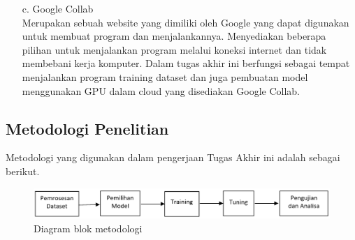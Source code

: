 \begin{itemize}
   \item [c.] Google Collab \\
   Merupakan sebuah website yang dimiliki oleh Google yang dapat digunakan untuk membuat program dan 
   menjalankannya. Menyediakan beberapa pilihan untuk menjalankan program melalui koneksi internet dan 
   tidak membebani kerja komputer. Dalam tugas akhir ini berfungsi sebagai tempat menjalankan program 
   training dataset dan juga pembuatan model menggunakan GPU dalam cloud yang disediakan Google Collab.
\end{itemize}
   

\subsection{Metodologi Penelitian}
Metodologi yang digunakan dalam pengerjaan Tugas Akhir ini adalah sebagai berikut.
    \begin{figure} [H] \centering
      \includegraphics[scale=0.5]{gambar/Metodologi.png}
      \caption{Diagram blok metodologi}
      \label{fig:Metodologi}
    \end{figure}


